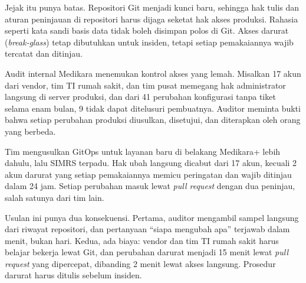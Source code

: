 Jejak itu punya batas. Repositori Git menjadi kunci baru, sehingga hak tulis dan aturan peninjauan
di repositori harus dijaga seketat hak akses produksi. Rahasia seperti kata sandi basis data tidak
boleh disimpan polos di Git. Akses darurat (\textit{break-glass}) tetap dibutuhkan untuk insiden,
tetapi setiap pemakaiannya wajib tercatat dan ditinjau.

\begin{kasus}[title={Kasus Medikara Health: GitOps sebagai Jawaban Temuan Audit Kontrol Akses}]
  Audit internal Medikara menemukan kontrol akses yang lemah. Misalkan 17 akun dari vendor, tim TI
  rumah sakit, dan tim pusat memegang hak administrator langsung di server produksi, dan dari 41
  perubahan konfigurasi tanpa tiket selama enam bulan, 9 tidak dapat ditelusuri pembuatnya.
  Auditor meminta bukti bahwa setiap perubahan produksi diusulkan, disetujui, dan diterapkan oleh
  orang yang berbeda.

  Tim mengusulkan GitOps untuk layanan baru di belakang Medikara+ lebih dahulu, lalu SIMRS
  terpadu. Hak ubah langsung dicabut dari 17 akun, kecuali 2 akun darurat yang setiap
  pemakaiannya memicu peringatan dan wajib ditinjau dalam 24 jam. Setiap perubahan masuk lewat
  \textit{pull request} dengan dua peninjau, salah satunya dari tim lain.

  Usulan ini punya dua konsekuensi. Pertama, auditor mengambil sampel langsung dari riwayat
  repositori, dan pertanyaan ``siapa mengubah apa'' terjawab dalam menit, bukan hari. Kedua, ada
  biaya: vendor dan tim TI rumah sakit harus belajar bekerja lewat Git, dan perubahan darurat
  menjadi 15 menit lewat \textit{pull request} yang dipercepat, dibanding 2 menit lewat akses
  langsung. Prosedur darurat harus ditulis sebelum insiden.
\end{kasus}

